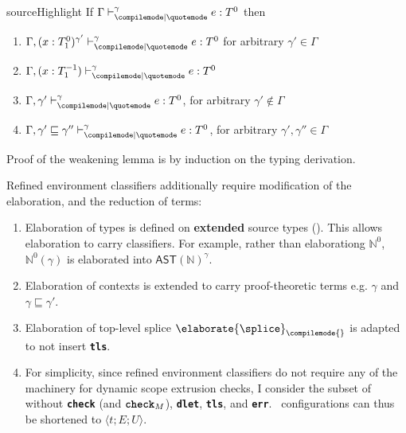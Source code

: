 \begin{lemma}{sourceHighlight}
  If $\rcqtypejudge{\gamma}{e}{T^0}$ then
  \begin{enumerate}
    \item $\rcqtypejudge[\Gamma, (x:T_1^0)^{\gamma'}]{\gamma}{e}{T^0}$ for arbitrary $\gamma' \in \Gamma$
    \item $\rcqtypejudge[\Gamma, (x:T_1^{-1})]{\gamma}{e}{T^0}$ 
    \item $\rcqtypejudge[\Gamma, \gamma']{\gamma}{e}{T^0}$, for arbitrary $\gamma' \notin \Gamma$
    \item $\rcqtypejudge[\Gamma, \gamma' \sqsubseteq \gamma'']{\gamma}{e}{T^0}$, for arbitrary $\gamma', \gamma'' \in \Gamma$
  \end{enumerate}
\end{lemma}
Proof of the weakening lemma is by induction on the typing derivation.

Refined environment classifiers additionally require modification of the elaboration, and the reduction of \coreLang{} terms:

\begin{enumerate}
  \item Elaboration of types is defined on \textbf{extended} source types (). This allows elaboration to carry classifiers. For example, rather than elaborationg $\mathbb{N}^0$, $\mathbb{N}^0(\gamma)$ is elaborated into $\textsf{AST}(\mathbb{N})^{\gamma}$.
  \item Elaboration of contexts is extended to carry proof-theoretic terms e.g. $\gamma$ and $\gamma \sqsubseteq \gamma'$.
  \item Elaboration of top-level splice $\elaborate{\splice}_{\compilemode{}}$ is adapted to not insert \textbf{\texttt{tls}}.
  \item For simplicity, since refined environment classifiers do not require any of the machinery for dynamic scope extrusion checks, I consider the subset of \coreLang{} without \textbf{\texttt{check}} (and $\textbf{\texttt{check}}_M$), \textbf{\texttt{dlet}}, \textbf{\texttt{tls}}, and \textbf{\texttt{err}}.\ \coreLang{} configurations can thus be shortened to $\langle t;E;U\rangle$.
\end{enumerate}

